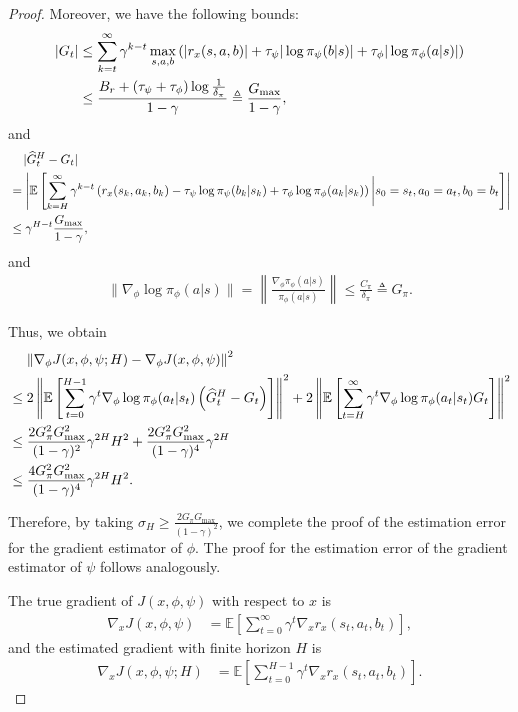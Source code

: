 \documentclass{article}
\theoremstyle{plain}
\theoremstyle{definition}
\theoremstyle{remark}
\def\E{\mathbb E}
\def\bydef{\triangleq}
\begin{document}
\begin{proof}
    Moreover, we have the following bounds:
    \begin{align}
        | G_t | & \leq \sum_{k=t}^\infty \gamma^{k-t} \max_{s,a,b} \left( |r_x(s,a,b)| + \tau_\psi |\log \pi_\psi(b|s)| + \tau_\phi |\log \pi_\phi(a|s)| \right) \notag\\
        & \leq \frac{B_r + (\tau_\psi + \tau_\phi) \log \frac{1}{\delta_\pi}}{1-\gamma} \bydef \frac{G_{\max}}{1-\gamma} ,
    \end{align}
    and 
    \begin{align}
        & \quad \,| \widehat{G}_t^H - G_t  | \notag \\
        & = \left| \E \left[ \sum_{k=H}^\infty \gamma^{k-t} \left(r_x(s_k,a_k,b_k) - \tau_\psi \log \pi_\psi(b_k|s_k) + \tau_\phi \log \pi_\phi(a_k|s_k) \right) \bigg| s_0 = s_t, a_0 = a_t, b_0 = b_t \right] \right| \notag\\
        & \leq \gamma^{H-t} \frac{G_{\max}}{1-\gamma},
    \end{align}
    and
    \begin{align}
        \|\nabla_\phi \log \pi_\phi(a|s) \| = \left\| \frac{\nabla_\phi \pi_\phi(a|s)}{\pi_\phi(a|s)} \right\| \leq \frac{C_\pi}{\delta_\pi} \bydef G_\pi .
    \end{align}

    Thus, we obtain
    \begin{align}
        & \quad \, \left\| \nabla_\phi J(x,\phi,\psi; H) - \nabla_\phi J(x,\phi,\psi) \right\|^2 \nonumber \\
        & \leq 2 \left\|\E \left[ \sum_{t=0}^{H-1} \gamma^t \nabla_\phi \log \pi_\phi(a_t|s_t)  \left( \widehat{G}_t^H - G_t \right)  \right] \right\|^2 +  2\left\| \E \left[ \sum_{t=H}^\infty \gamma^t \nabla_\phi \log \pi_\phi(a_t|s_t) G_t  \right] \right\|^2 \notag \\
        & \leq  \frac{2 G_\pi^2G_{\max}^2}{(1-\gamma)^2} \gamma^{2H} H^2+ \frac{2G_\pi^2 G_{\max}^2}{(1-\gamma)^4} \gamma^{2H}\notag \\
        & \leq \frac{4G_\pi^2 G_{\max}^2}{(1-\gamma)^4} \gamma^{2H} H^2.
    \end{align}

    Therefore, by taking $\sigma_H \ge \frac{2 G_\pi G_{\max}}{(1-\gamma)^2}$, we complete the proof of the estimation error for the gradient estimator of $\phi$. The proof for the estimation error of the gradient estimator of $\psi$ follows analogously.



    The true gradient of $J(x,\phi,\psi)$ with respect to $x$ is
    \begin{align}
        \nabla_x J(x,\phi,\psi) & = \E \left[ \sum_{t=0}^\infty \gamma^t \nabla_x r_x(s_t,a_t,b_t)\right],
    \end{align}
    and the estimated gradient with finite horizon $H$ is 
    \begin{align}
        \nabla_x J(x,\phi,\psi;H) & = \E \left[ \sum_{t=0}^{H-1} \gamma^t \nabla_x r_x(s_t,a_t,b_t)\right].
    \end{align}


\end{proof}
\end{document}
